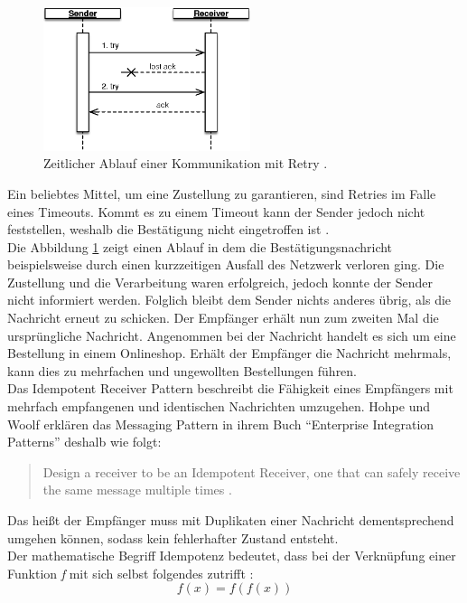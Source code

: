 \begin{figure}[H]
 \centering
 \includegraphics[width=0.54\textwidth]{4-Hauptteil/idempotent-receiver/sequence-failed-ack.eps}
 \caption{Zeitlicher Ablauf einer Kommunikation mit Retry \cite[S.~528]{hohpe_enterprise_2004}.}
 \label{fig:failed-ack}
\end{figure}

Ein beliebtes Mittel, um eine Zustellung zu garantieren, sind Retries im Falle eines Timeouts. Kommt es zu einem Timeout kann der Sender jedoch nicht feststellen, weshalb die Bestätigung nicht eingetroffen ist \cite[S.~382]{vernon_reactive_2016} \cite[S.~528]{hohpe_enterprise_2004}.\\
Die Abbildung \ref{fig:failed-ack} zeigt einen Ablauf in dem die Bestätigungsnachricht beispielsweise durch einen kurzzeitigen Ausfall des Netzwerk verloren ging. Die Zustellung und die Verarbeitung waren erfolgreich, jedoch konnte der Sender nicht informiert werden. Folglich bleibt dem Sender nichts anderes übrig, als die Nachricht erneut zu schicken. Der Empfänger erhält nun zum zweiten Mal die ursprüngliche Nachricht. Angenommen bei der Nachricht handelt es sich um eine Bestellung in einem Onlineshop. Erhält der Empfänger die Nachricht mehrmals, kann dies zu mehrfachen und ungewollten Bestellungen führen.\\
Das Idempotent Receiver Pattern beschreibt die Fähigkeit eines Empfängers mit mehrfach empfangenen und identischen Nachrichten umzugehen. Hohpe und Woolf erklären das Messaging Pattern in ihrem Buch \enquote{Enterprise Integration Patterns} deshalb wie folgt:

\begin{quotation}
Design a receiver to be an Idempotent Receiver, one that can safely receive the same message multiple times \cite[S.~529]{hohpe_enterprise_2004}.
\end{quotation}

Das heißt der Empfänger muss mit Duplikaten einer Nachricht dementsprechend umgehen können, sodass kein fehlerhafter Zustand entsteht.\\
Der mathematische Begriff Idempotenz bedeutet, dass bei der Verknüpfung einer Funktion \textit{f} mit sich selbst folgendes zutrifft \cite[S.~529]{hohpe_enterprise_2004}:
\[f(x) = f(f(x))\]

